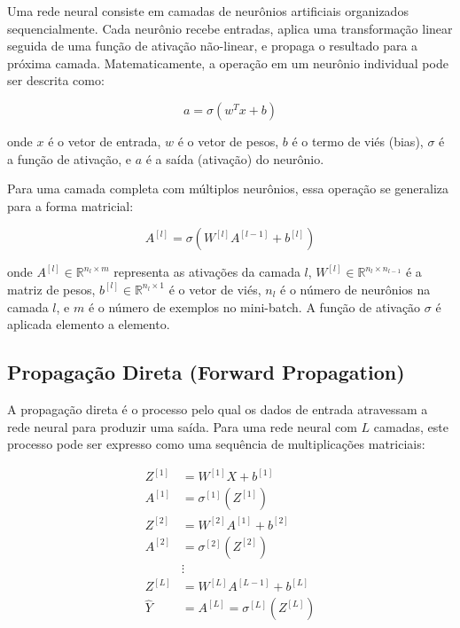 \documentclass[12pt,a4paper]{article}
\begin{document}
Uma rede neural consiste em camadas de neurônios artificiais organizados sequencialmente. Cada neurônio recebe entradas, aplica uma transformação linear seguida de uma função de ativação não-linear, e propaga o resultado para a próxima camada. Matematicamente, a operação em um neurônio individual pode ser descrita como:

\begin{equation}
a = \sigma(w^T x + b)
\end{equation}

onde $x$ é o vetor de entrada, $w$ é o vetor de pesos, $b$ é o termo de viés (bias), $\sigma$ é a função de ativação, e $a$ é a saída (ativação) do neurônio.

Para uma camada completa com múltiplos neurônios, essa operação se generaliza para a forma matricial:

\begin{equation}
A^{[l]} = \sigma(W^{[l]} A^{[l-1]} + b^{[l]})
\end{equation}

onde $A^{[l]} \in \mathbb{R}^{n_l \times m}$ representa as ativações da camada $l$, $W^{[l]} \in \mathbb{R}^{n_l \times n_{l-1}}$ é a matriz de pesos, $b^{[l]} \in \mathbb{R}^{n_l \times 1}$ é o vetor de viés, $n_l$ é o número de neurônios na camada $l$, e $m$ é o número de exemplos no mini-batch. A função de ativação $\sigma$ é aplicada elemento a elemento.

\subsection{Propagação Direta (Forward Propagation)}

A propagação direta é o processo pelo qual os dados de entrada atravessam a rede neural para produzir uma saída. Para uma rede neural com $L$ camadas, este processo pode ser expresso como uma sequência de multiplicações matriciais:

\begin{align}
Z^{[1]} &= W^{[1]} X + b^{[1]} \\
A^{[1]} &= \sigma^{[1]}(Z^{[1]}) \\
Z^{[2]} &= W^{[2]} A^{[1]} + b^{[2]} \\
A^{[2]} &= \sigma^{[2]}(Z^{[2]}) \\
&\vdots \\
Z^{[L]} &= W^{[L]} A^{[L-1]} + b^{[L]} \\
\hat{Y} &= A^{[L]} = \sigma^{[L]}(Z^{[L]})
\end{align}
\end{document}
